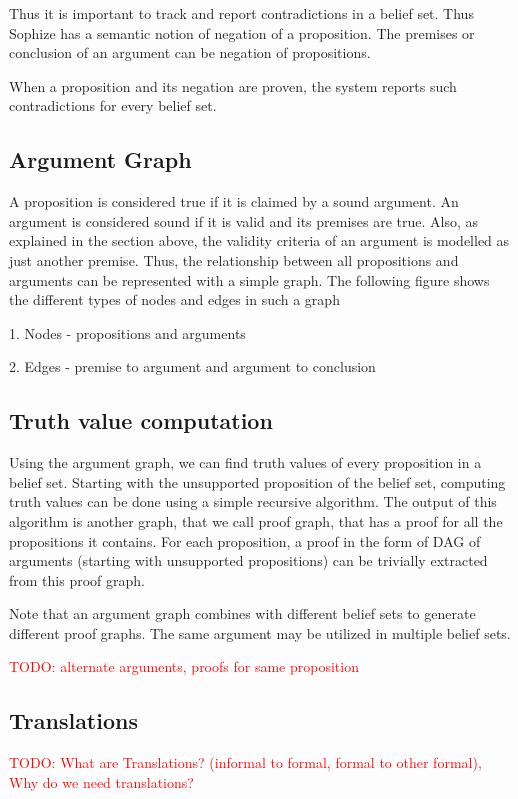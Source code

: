 \documentclass[a4paper]{article}
\newcommand\todo[1]{\textcolor{red}{TODO: #1}}
\begin{document}
Thus it is important to track and report contradictions in a belief set. Thus Sophize has a semantic notion of negation of a proposition. The premises or conclusion of an argument can be negation of propositions.

When a proposition and its negation are proven, the system reports such contradictions for every belief set.

\subsection{Argument Graph}
A proposition is considered true if it is claimed by a sound argument. An argument is considered sound if it is valid and its premises are true. Also, as explained in the section above, the validity criteria of an argument is modelled as just another premise. Thus, the relationship between all propositions and arguments can be represented with a simple graph. The following figure shows the different types of nodes and edges in such a graph

1. Nodes - propositions and arguments

2. Edges - premise to argument and argument to conclusion

\subsection{Truth value computation}

Using the argument graph, we can find truth values of every proposition in a belief set. Starting with the unsupported proposition of the belief set, computing truth values can be done using a simple recursive algorithm. The output of this algorithm is another graph, that we call proof graph, that has a proof for all the propositions it contains. For each proposition, a proof in the form of DAG of arguments (starting with unsupported propositions) can be trivially extracted from this proof graph.

Note that an argument graph combines with different belief sets to generate different proof graphs. The same argument may be utilized in multiple belief sets.

\todo{alternate arguments, proofs for same proposition}

\subsection{Translations}
\todo{What are Translations? (informal to formal, formal to other formal), Why do we need translations?}
\end{document}
